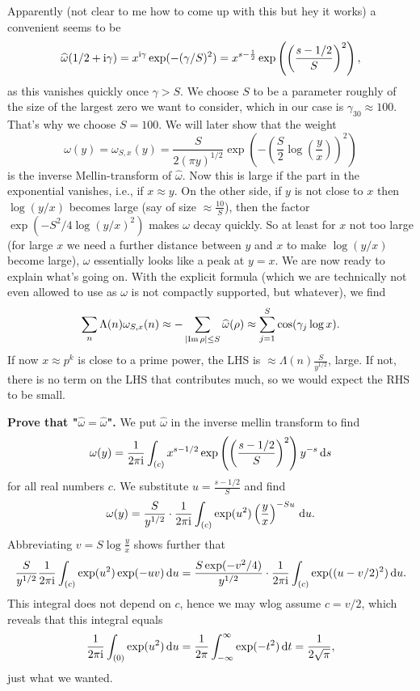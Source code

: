 \documentclass[a4paper,11pt]{article}
\begin{document}
Apparently (not clear to me how to come up with this but hey it works) a
convenient seems to be 
\[
    \widehat \omega(1/2 + \mathrm i \gamma) = x^{\mathrm i \gamma} \exp(-(\gamma/S)^2) = 
    x^{s-\frac 12} \exp\left( \left(\frac{s-1/2}{S}\right)^2\right),
\]
as this vanishes quickly once $\gamma > S$. We choose $S$ to be a parameter roughly
of the size of the largest zero we want to consider, which in our case is 
$\gamma_{30} \approx 100$. That's why we choose $S = 100$. We will later show
that the weight 
\[
    \omega(y) = \omega_{S,x}(y) = \frac {S}{2(\pi y)^{1/2}} \exp \left(
        -\left( \frac S2 \log\left(\frac yx\right) \right)^2
    \right)
\]
is the inverse Mellin-transform of $\hat \omega$. Now this is large if 
the part in the exponential vanishes, i.e., if $x \approx y$. On the other side,
if $y$ is not close to $x$ then $\log(y/x)$ becomes large (say of size
$\approx \frac{10}S$), then the factor $\exp(-S^2/4 \log(y/x)^2)$ makes
$\omega$ decay quickly. So at least for $x$ not too large (for large $x$ we need
a further distance between $y$ and $x$ to make $\log(y/x)$ become large), $\omega$
essentially looks like a peak at $y=x$. 
We are now ready to explain what's going on. With the explicit formula
(which we are technically not even allowed to use as $\omega$ is not compactly
supported, but whatever), we find
\[
    \sum_n \Lambda(n) \omega_{S,x}(n) \approx - \sum_{\left\lvert \operatorname{Im} \rho \right\rvert \leq S} \widehat
    \omega(\rho) \approx \sum_{j=1}^S \cos(\gamma_j \log x).
\]
If now $x \approx p^k$ is close to a prime power, the LHS is $\approx \Lambda(n)
\frac{S}{y^{1/2}}$, large. If not, there is no term on the LHS that
contributes much, so we would expect the RHS to be small. 

\textbf{Prove that "$\hat \omega = \hat \omega$".} We put $\hat \omega$ in the
inverse mellin transform to find
\[
    \omega(y) = \frac{1}{2 \pi \mathrm i} \int_{(c)} x^{s-1/2} \exp\left( \left(
    \frac{s-1/2}{S}\right)^2 \right) y^{-s} \mathrm{\,d} s
\]
for all real numbers $c$. We substitute $u = \frac{s-1/2}S$ and find
\[
    \omega(y) = \frac S{y^{1/2}} \cdot \frac{1}{2 \pi \mathrm i} \int_{(c)}
    \exp(u^2) \left( \frac yx \right)^{-Su} \mathrm{\,d} u.
\]
Abbreviating $v = S \log \frac yx$ shows further that 
\[
    \frac S{y^{1/2}} \frac{1}{2 \pi \mathrm i} \int_{(c)} \exp(u^2) \exp(-uv) \mathrm{\,d} u 
    = \frac{S \exp(-v^2/4)}{y^{1/2}} \cdot \frac{1}{2 \pi \mathrm i} \int_{(c)}
    \exp((u-v/2)^2) \mathrm{\,d} u.
\]
This integral does not depend on $c$, hence we may wlog assume $c=v/2$, which reveals
that this integral equals
\[
    \frac{1}{2 \pi \mathrm i} \int_{(0)} \exp(u^2) \mathrm{\,d} u = \frac 1{2\pi} \int_{-\infty}^{\infty}
    \exp(-t^2) \mathrm{\,d} t = \frac 1{2 \sqrt \pi},
\]
just what we wanted.
\end{document}
